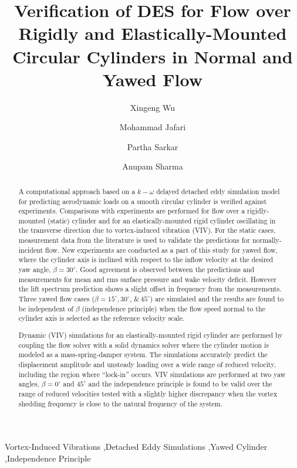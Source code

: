 \documentclass[12pt,authoryear]{elsarticle}
\begin{document}
\begin{frontmatter}

\title{Verification of DES for Flow over Rigidly and Elastically-Mounted
Circular Cylinders in Normal and Yawed Flow}


\author[1]{Xingeng Wu}
\author[1]{Mohammad Jafari} 
\author[2]{Partha Sarkar}
\author[3]{Anupam Sharma}

\address{Department of Aerospace Engineering, Iowa State University, Ames, Iowa, 50011}

\begin{abstract}
A computational approach based on a $k-\omega$ delayed detached eddy simulation
model for predicting aerodynamic loads on a smooth circular cylinder is
verified against experiments. Comparisons with experiments are performed for
flow over a rigidly-mounted (static) cylinder and for an elastically-mounted
rigid cylinder oscillating in the transverse direction due to vortex-induced
vibration (VIV). For the static cases, measurement data from the literature is
used to validate the predictions for normally-incident flow.  New experiments
are conducted as a part of this study for yawed flow, where the cylinder axis
is inclined with respect to the inflow velocity at the desired yaw angle,
$\beta=30^\circ$. Good agreement is observed between the predictions and
measurements for mean and rms surface pressure and wake velocity deficit.
However the lift spectrum prediction shows a slight offset in frequency from
the measurements. Three yawed flow cases ($\beta=15^\circ, 30^\circ, \,\&\,
45^\circ$) are simulated and the results are found to be independent of $\beta$
(independence principle) when the flow speed normal to the cylinder axis is
selected as the reference velocity scale.

Dynamic (VIV) simulations for an elastically-mounted rigid cylinder are
performed by coupling the flow solver with a solid dynamics solver where the
cylinder motion is modeled as a mass-spring-damper system. The simulations
accurately predict the displacement amplitude and unsteady loading over a wide
range of reduced velocity, including the region where ``lock-in'' occurs. VIV
simulations are performed at two yaw angles, $\beta=0^\circ$ and $45^\circ$ and
the independence principle is found to be valid over the range of reduced
velocities tested with a slightly higher discrepancy when the vortex shedding
frequency is close to the natural frequency of the system.
\end{abstract}

\begin{keyword}
  Vortex-Induced Vibrations \sep Detached Eddy Simulations \sep Yawed Cylinder
  \sep Independence Principle
\end{keyword}
\end{frontmatter}
\end{document}
